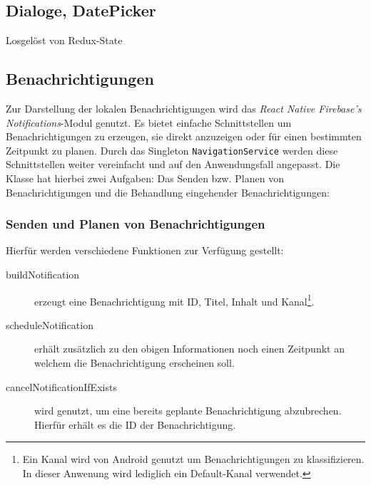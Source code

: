 


\subsection{Dialoge, DatePicker}
Losgelöst von Redux-State

\subsection{Benachrichtigungen}
Zur Darstellung der lokalen Benachrichtigungen wird das \emph{React Native Firebase's Notifications}-Modul genutzt.
Es bietet einfache Schnittstellen um Benachrichtigungen zu erzeugen,
sie direkt anzuzeigen oder für einen bestimmten Zeitpunkt zu planen.
Durch das Singleton \texttt{NavigationService} werden diese Schnittstellen weiter vereinfacht und auf den Anwendungsfall angepasst.
Die Klasse hat hierbei zwei Aufgaben: Das Senden bzw. Planen von Benachrichtigungen und die Behandlung eingehender Benachrichtigungen:

\subsubsection{Senden und Planen von Benachrichtigungen}
Hierfür werden verschiedene Funktionen zur Verfügung gestellt:
\begin{description}
    \item[buildNotification] erzeugt eine Benachrichtigung mit ID, Titel, Inhalt und Kanal\footnote{Ein Kanal wird von Android genutzt um Benachrichtigungen zu klassifizieren. In dieser Anwenung wird lediglich ein Default-Kanal verwendet.}.
    \item[scheduleNotification] erhält zusätzlich zu den obigen Informationen noch einen Zeitpunkt an welchem die Benachrichtigung erscheinen soll.
    \item[cancelNotificationIfExists] wird genutzt, um eine bereits geplante Benachrichtigung abzubrechen. Hierfür erhält es die ID der Benachrichtigung.
\end{description}

